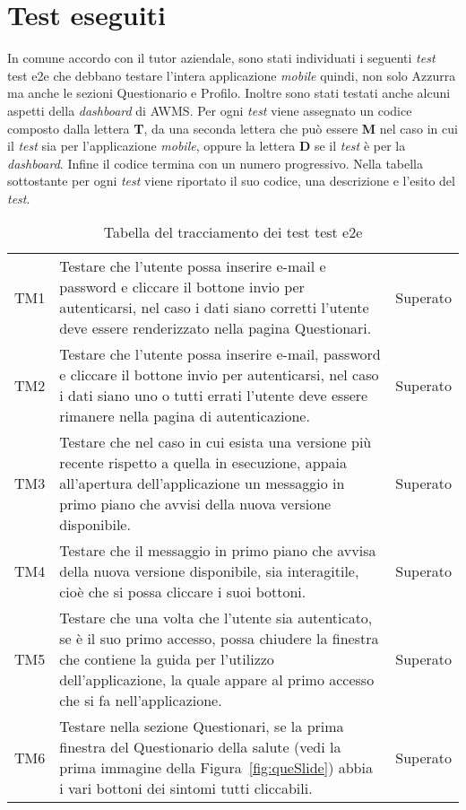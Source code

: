\section{Test eseguiti}
In comune accordo con il tutor aziendale, sono stati individuati i seguenti \emph{test} \gls{test e2e} che debbano testare l'intera applicazione \emph{mobile} quindi, non solo Azzurra ma anche le sezioni Questionario e Profilo. Inoltre sono stati testati anche alcuni aspetti della \emph{dashboard} di \gls{AWMS}\ap{[g]}. Per ogni \emph{test} viene assegnato un codice composto dalla lettera \textbf{T}, da una seconda lettera che può essere \textbf{M} nel caso in cui il \emph{test} sia per l'applicazione \emph{mobile}, oppure la lettera \textbf{D} se il \emph{test} è per la \emph{dashboard}. Infine il codice termina con un numero progressivo. Nella tabella sottostante per ogni \emph{test} viene riportato il suo codice, una descrizione e l'esito del \emph{test}.
\begin{table}[h]%
	\centering
	\begin{tabularx}{\textwidth}{c X c}
		\hline	
		\rowcolor{giallo}
		\intest{Codice} &  \intest{Descrizione} & \intest{Esito}\\	
		\hline			
		TM1 & Testare che l'utente possa inserire e-mail e password e cliccare il bottone invio per autenticarsi, nel caso i dati siano corretti l'utente deve essere renderizzato nella pagina Questionari. & Superato\\
		TM2 & Testare che l'utente possa inserire e-mail, password e cliccare il bottone invio per autenticarsi, nel caso i dati siano uno o tutti errati l'utente deve essere rimanere nella pagina di autenticazione. & Superato\\
		TM3 & Testare che nel caso in cui esista una versione più recente rispetto a quella in esecuzione, appaia all'apertura dell'applicazione un messaggio in primo piano che avvisi della nuova versione disponibile. & Superato\\
		TM4 & Testare che il messaggio in primo piano che avvisa della nuova versione disponibile, sia interagitile, cioè che si possa cliccare i suoi bottoni. & Superato\\
		TM5 & Testare che una volta che l'utente sia autenticato, se è il suo primo accesso, possa chiudere la finestra che contiene la guida per l'utilizzo dell'applicazione, la quale appare al primo accesso che si fa nell'applicazione. & Superato\\
		TM6 & Testare nella sezione Questionari, se la prima finestra del Questionario della salute (vedi la prima immagine della Figura~\ref{fig:queSlide}) abbia i vari bottoni dei sintomi tutti cliccabili. & Superato\\
			\end{tabularx} \hbox{}
	\caption{Tabella del tracciamento dei test \gls{test e2e}}
\end{table}%

